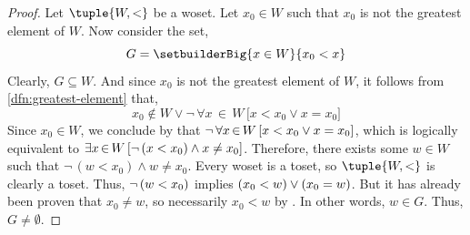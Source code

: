\begin{proof}
    Let \( \tuple{W, <} \) be a woset. Let \( x_{0} \in W \) such that \( x_{0} \) is not the greatest element of \( W \). Now consider the set,
    \begin{equation*}
        G = \setbuilderBig{x \in W}{x_{0} < x}
    \end{equation*}
    Clearly, \( G \subseteq W \). And since \( x_{0} \) is not the greatest element of \( W \), it follows from \cref{dfn:greatest-element} that,
    \begin{equation*}
        x_{0} \notin W \lor \lnot \, \forall x\,{\in}\,W \, \big[ x < x_{0} \lor x = x_{0} \big]
    \end{equation*}
    Since \( x_{0} \in W \), we conclude by  that \( \lnot \, \forall x\,{\in}\,W \, \mleft[ x < x_{0} \lor x = x_{0} \mright] \),
    which is logically equivalent to \( \exists x\,{\in}\,W \, \mleft[ \lnot \, \mleft( x < x_{0} \mright) \land x \neq x_{0} \mright] \). Therefore,
    there exists some \( w \in W \) such that \( \lnot \, (w < x_{0}) \land w \neq x_{0} \). Every woset is a toset, so \( \tuple{W, <} \) is clearly a
    toset. Thus, \( \lnot \, \mleft( w < x_{0} \mright) \) implies \( \mleft(  x_{0} < w \mright)  \lor \mleft(x_{0} = w \mright) \).
    But it has already been proven that \( x_{0} \neq w \), so necessarily \( x_{0} < w \) by .
    In other words, \( w \in G \). Thus,
    \( G \neq \emptyset \).


\end{proof}
